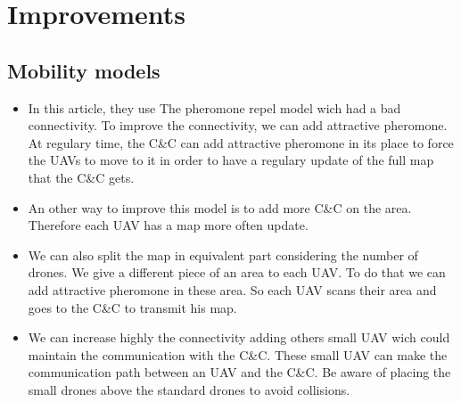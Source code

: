 \chapter{Improvements}

\section{Mobility models}

\begin{itemize}

\item In this article, they use The pheromone repel model wich had a bad connectivity. To improve the connectivity, we can add attractive pheromone. At regulary time, the C\&C can add attractive pheromone in its place to force the UAVs to move to it in order to have a regulary update of the full map that the C\&C gets.

\item An other way to improve this model is to add more C\&C on the area. Therefore each UAV has a map more often update.

\item We can also split the map in equivalent part considering the number of drones. We give a different piece of an area to each UAV. To do that we can add attractive pheromone in these area. So each UAV scans their area and goes to the C\&C to transmit his map.

\item We can increase highly the connectivity adding others small UAV wich could maintain the communication with the C\&C. These small UAV can make the communication path between an UAV and the C\&C. Be aware of placing the small drones above the standard drones to avoid collisions.

\end{itemize}


